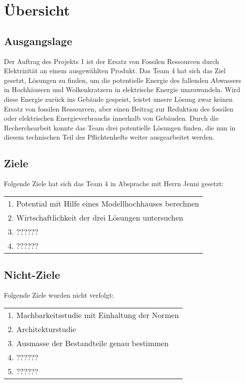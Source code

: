 \section{Übersicht} \label{sec:uebersicht}
\subsection{Ausgangslage}
Der Auftrag des Projekts 1 ist der Ersatz von Fossilen Ressourcen durch Elektrizität an einem ausgewählten Produkt. Das Team 4 hat sich das Ziel gesetzt, Lösungen zu finden, um die potentielle Energie des fallenden Abwassers in Hochhäusern und Wolkenkratzern in elektrische Energie umzuwandeln. Wird diese Energie zurück ins Gebäude gespeist, leistet unsere Lösung zwar keinen Ersatz von fossilen Ressourcen, aber einen Beitrag zur Reduktion des fossilen oder elektrischen Energieverbrauchs innerhalb von Gebäuden.
Durch die Recherchearbeit konnte das Team drei potentielle Lösungen finden, die nun in diesem technischen Teil des Pflichtenhefts weiter ausgearbeitet werden.
\renewcommand\arraystretch{1.5}
\subsection{Ziele}
Folgende Ziele hat sich das Team 4 in Absprache mit Herrn Jenni gesetzt:
\begin{table}[H]
\begin{tabular}{l}
\hline
1. Potential mit Hilfe eines Modellhochhauses berechnen\\
2. Wirtschaftlichkeit der drei Lösungen untersuchen\\
3. ??????\\
4. ??????\\
\hline
\end{tabular}
\end{table}

\subsection{Nicht-Ziele}
Folgende Ziele wurden nicht verfolgt:
\begin{table}[H]
\begin{tabular}{l}
\hline
1. Machbarkeitsstudie mit Einhaltung der Normen\\ 
2. Architekturstudie\\
3. Ausmasse der Bestandteile genau bestimmen\\
4. ??????\\
5. ??????\\
\hline
\end{tabular}
\end{table}
